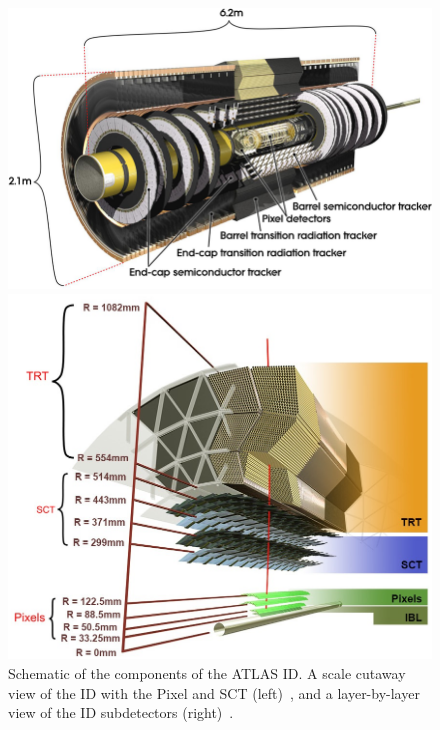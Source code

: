 \begin{figure}[!thp]
    \begin{minipage}[c]{.53\textwidth}
        \includegraphics[width=\textwidth]{chapters/chapter2_experiment/images/id_slice.png}
    \end{minipage}
    \begin{minipage}[c]{.45\textwidth}
        \includegraphics[width=\textwidth]{chapters/chapter2_experiment/images/id_layer.png} 
    \end{minipage}
    \caption[Schematic of the components of the ATLAS \gls{ID}]{Schematic of the components of the ATLAS \gls{ID}. A scale cutaway view of the \gls{ID} with the Pixel and \gls{SCT} (left)~\cite{pixel-electronics}, and a layer-by-layer view of the \gls{ID} subdetectors (right)~\cite{id-perf2015}.}
\end{figure}
    

